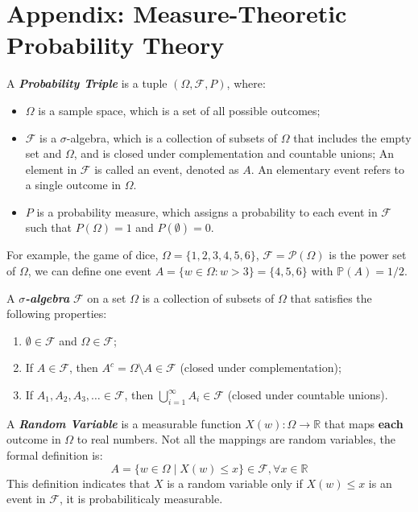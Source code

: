 \documentclass[10pt]{elegantbook}
\newcommand{\mydefination}[1]{\textbf{\textit{\textcolor{structurecolor}{#1}}}}
\begin{document}
\section{Appendix: Measure-Theoretic Probability Theory}
A \mydefination{Probability Triple} is a tuple $(\Omega, \mathcal F, P)$, where:
\begin{itemize}
    \item $\Omega$ is a sample space, which is a set of all possible outcomes;
    \item $\mathcal F$ is a $\sigma$-algebra, which is a collection of subsets of $\Omega$ that includes the empty set and $\Omega$, and is closed under complementation and countable unions;
    An element in $\mathcal F$ is called an event, denoted as $A$. An elementary event refers to a single outcome in $\Omega$.
    \item $P$ is a probability measure, which assigns a probability to each event in $\mathcal F$ such that $P(\Omega) = 1$ and $P(\emptyset) = 0$.
\end{itemize}

For example, the game of dice, $\Omega = \{1, 2, 3, 4, 5, 6\}$, $\mathcal F = \mathcal P(\Omega)$ is the power set of $\Omega$, we can define one 
event $A = \{ w \in \Omega : w > 3 \} = \{4, 5, 6 \}$ with $\mathbb P(A) = 1 / 2$. 

\begin{definition}
    A \mydefination{$\sigma$-algebra} $\mathcal F$ on a set $\Omega$ is a collection of subsets of $\Omega$ that satisfies the following properties:
    \begin{enumerate}
        \item $\emptyset \in \mathcal F$ and $\Omega \in \mathcal F$;
        \item If $A \in \mathcal F$, then $A^c = \Omega \setminus A \in \mathcal F$ (closed under complementation);
        \item If $A_1, A_2, A_3, \ldots \in \mathcal F$, then $\bigcup_{i=1}^{\infty} A_i \in \mathcal F$ (closed under countable unions).
    \end{enumerate}
\end{definition}

A \mydefination{Random Variable} is a measurable function $X(w): \Omega \rightarrow \mathbb R$ that maps \textbf{each} outcome in $\Omega$ to real numbers.
Not all the mappings are random variables, the formal definition is:
\[ A = \{ w \in \Omega \mid X(w) \leq x \} \in \mathcal F, \forall x \in \mathbb R \]
This definition indicates that $X$ is a random variable only if $X(w) \leq x$ is an event in $\mathcal F$, it is probabiliticaly measurable.
\end{document}
